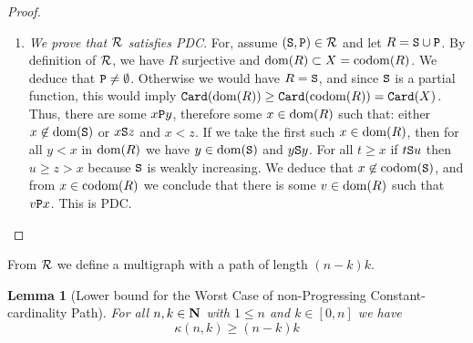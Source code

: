 \documentclass{lmcs}
\newtheorem{lemma}[theorem]{Lemma}
\begin{document}
\begin{proof}
\begin{enumerate}
\item
\emph{We prove that ${\mathcal R}$ satisfies PDC}.  
For, assume $({\tt S}, {\tt P}) \in {\mathcal R}$ and let $R = {\tt S} \cup {\tt P}$.
By definition of ${\mathcal R}$, we have $R$ surjective and ${\rm dom}(R) \subset X = {\rm codom}(R)$. 
We deduce that ${\tt P} \not = \emptyset$. Otherwise we would have $R = {\tt S}$, and
since ${\tt S}$ is a partial function, this would imply ${\tt Card}({\rm dom}(R)) \ge {\tt Card}({\rm codom}(R))
= {\tt Card}(X)$.
Thus, there are some $x {\tt P} y$, therefore some $x \in {\rm dom}(R)$ 
such that: either $x \not \in {\rm dom}({\tt S})$ or $x {\tt S} z$ and $x < z$. If we take the first such 
$x \in {\rm dom}(R)$, then for all $y < x$ in ${\rm dom}(R)$ we have $y \in {\rm dom}({\tt S})$
and $y {\tt S} y$. For all $t \ge x$
if $t {\tt S} u$ then $u \ge z > x$ because ${\tt S}$ is weakly increasing. We deduce that
$x \not \in {\rm codom}({\tt S})$, and from $x \in {\rm codom}(R)$ we conclude that
there is some $v \in {\rm dom}(R)$ such that $v {\tt P} x$. This is PDC.

\end{enumerate}
\end{proof}

From ${\mathcal R}$ we define a multigraph with a path of length $(n-k)k$.

\begin{lemma}[Lower bound for the Worst Case of 
non-Progressing Constant-cardinality Path]
For all $n,k \in {\bf N}$ with $1 \le n$ and $k \in [0,n]$ we have $$\kappa(n,k) \ge (n-k)k$$
\end{lemma}
\end{document}
